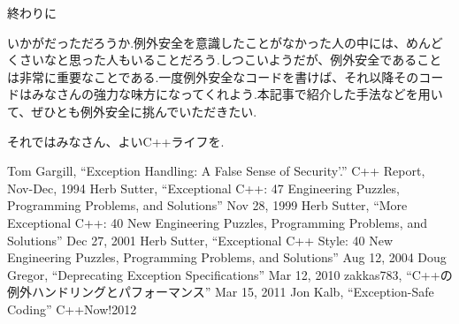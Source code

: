 \documentclass[a4j,11pt,openright]{jsbook}
\makeatletter
\renewcommand{\chapter}{\@startsection {chapter}{1}{\z@}{-3.5ex \@plus -1ex \@minus -.2ex}{2.3ex \@plus.2ex}
{\normalfont\LARGE\bfseries}}
\makeatother
\begin{document}
\chapter{終わりに}

いかがだっただろうか.例外安全を意識したことがなかった人の中には、めんどくさいなと思った人もいることだろう.しつこいようだが、例外安全であることは非常に重要なことである.一度例外安全なコードを書けば、それ以降そのコードはみなさんの強力な味方になってくれよう.本記事で紹介した手法などを用いて、ぜひとも例外安全に挑んでいただきたい.

それではみなさん、よいC++ライフを.

\newpage
\begin{thebibliography}{9}
   Tom Gargill, ``Exception Handling: A False Sense of Security'.'' C++ Report, Nov-Dec, 1994
   Herb Sutter, ``Exceptional C++: 47 Engineering Puzzles, Programming Problems, and Solutions'' Nov 28, 1999
   Herb Sutter, ``More Exceptional C++: 40 New Engineering Puzzles, Programming Problems, and Solutions'' Dec 27, 2001
   Herb Sutter, ``Exceptional C++ Style: 40 New Engineering Puzzles, Programming Problems, and Solutions'' Aug 12, 2004
   Doug Gregor, ``Deprecating Exception Specifications'' Mar 12, 2010
   zakkas783, ``C++の例外ハンドリングとパフォーマンス'' Mar 15, 2011
   Jon Kalb, ``Exception-Safe Coding'' C++Now!2012
\end{thebibliography}
\end{document}
